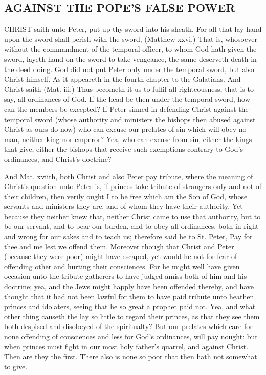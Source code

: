 \subsection*{AGAINST THE POPE'S FALSE POWER}

CHRIST saith unto Peter, put up thy sword into his sheath. 
For all that lay hand upon the sword shall perish with 
the sword, (Matthew xxvi.) That is, whosoever without the 
commandment of the temporal officer, to whom God hath 
given the sword, layeth hand on the sword to take vengeance,
the same deserveth death in the deed doing. God did 
not put Peter only under the temporal sword, but also
Christ himself. As it appeareth in the fourth chapter to
the Galatians. And Christ saith (Mat. iii.) Thus becometh
it us to fulfil all righteousness, that is to say, all 
ordinances of God. If the head be then under the temporal
sword, how can the members be excepted? If 
Peter sinned in defending Christ against the temporal 
sword (whose authority and ministers the bishops then 
abused against Christ as ours do now) who can excuse our 
prelates of sin which will obey no man, neither king nor 
emperor? Yea, who can excuse from sin, either the kings 
that give, either the bishops that receive such exemptions 
contrary to God's ordinances, and Christ's doctrine? 

And Mat. xviith, both Christ and also Peter pay tribute, 
where the meaning of Christ's question unto Peter is, if 
princes take tribute of strangers only and not of their 
children, then verily ought I to be free which am the Son 
of God, whose servants and ministers they are, and of 
whom they have their authority. Yet because they neither 
knew that, neither Christ came to use that authority, but 
to be our servant, and to bear our burden, and to obey all 
ordinances, both in right and wrong for our sakes and to 
teach us; therefore said he to St. Peter, Pay for thee and 
me lest we offend them. Moreover though that Christ 
and Peter (because they were poor) might have escaped, 
yet would he not for fear of offending other and hurting 
their consciences. For he might well have given occasion 
unto the tribute gatherers to have judged amiss both of 
him and his doctrine; yea, and the Jews might happly 
have been offended thereby, and have thought that it had 
not been lawful for them to have paid tribute unto heathen 
princes and idolaters, seeing that he so great a prophet 
paid not. Yea, and what other thing causeth the lay 
so little to regard their princes, as that they see them both 
despised and disobeyed of the spiritualty? But our prelates
which care for none offending of consciences and less
for God's ordinances, will pay nought: but when princes
must fight in our most holy father's quarrel, and against
Christ. Then are they the first. There also is none so 
poor that then hath not somewhat to give.

